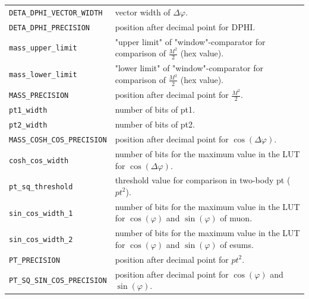 \begin{longtable}{>{\footnotesize}l >{\footnotesize}p{}}
\verb|DETA_DPHI_VECTOR_WIDTH| & vector width of $\Delta\varphi$.\\
\verb|DETA_DPHI_PRECISION| & position after decimal point for DPHI.\\
\verb|mass_upper_limit| & "upper limit" of "window"-comparator for comparison of $\frac{M^2}{2}$ (hex value).\\
\verb|mass_lower_limit| & "lower limit" of "window"-comparator for comparison of $\frac{M^2}{2}$ (hex value).\\
\verb|MASS_PRECISION| & position after decimal point for $\frac{M^2}{2}$.\\
\verb|pt1_width| & number of bits of pt1.\\
\verb|pt2_width| & number of bits of pt2.\\
\verb|MASS_COSH_COS_PRECISION| & position after decimal point for $\cos(\Delta\varphi)$.\\
\verb|cosh_cos_width| & number of bits for the maximum value in the LUT for $\cos(\Delta\varphi)$.\\
\verb|pt_sq_threshold| & threshold value for comparison in two-body pt (${pt^2}$).\\
\verb|sin_cos_width_1| & number of bits for the maximum value in the LUT for $\cos(\varphi)$ and $\sin(\varphi)$ of muon.\\
\verb|sin_cos_width_2| & number of bits for the maximum value in the LUT for $\cos(\varphi)$ and $\sin(\varphi)$ of esums.\\
\verb|PT_PRECISION| & position after decimal point for ${pt^2}$.\\
\verb|PT_SQ_SIN_COS_PRECISION| & position after decimal point for $\cos(\varphi)$ and $\sin(\varphi)$.\\


\end{longtable}
